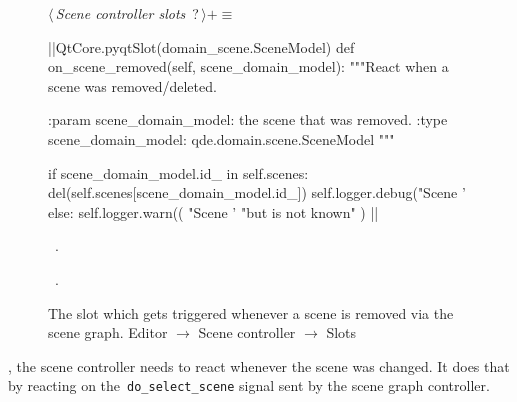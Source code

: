 \documentclass[%
    a4paper,    %
    justified,  %
    nobib,      %
    openany     %
]{tufte-book}
\begin{document}
\begin{figure}
\begin{flushleft} \small
\begin{minipage}{\linewidth}\label{scrap94}\raggedright\small
{} $\langle\,${\itshape Scene controller slots}\nobreak\ {\footnotesize {?}}$\,\rangle+\equiv$
\vspace{-1ex}
\begin{pythoncode}
|\normalfont{}\fontfamily{}|QtCore.pyqtSlot(domain_scene.SceneModel)
def on_scene_removed(self, scene_domain_model):
    """React when a scene was removed/deleted.

    :param scene_domain_model: the scene that was removed.
    :type scene_domain_model:  qde.domain.scene.SceneModel
    """

    if scene_domain_model.id_ in self.scenes:
        del(self.scenes[scene_domain_model.id_])
        self.logger.debug("Scene '%
    else:
        self.logger.warn((
            "Scene '%
            "but is not known"
        ) %
|\NWsep|
\end{pythoncode}
\vspace{1.5ex}
\footnotesize
\begin{list}{}{\setlength{\itemsep}{-\parsep}\setlength{\itemindent}{-\leftmargin}}
\item \NWtxtMacroDefBy\ .
\item \NWtxtMacroRefIn\ .

\item{}
\end{list}
\end{minipage}\vspace{4ex}
\end{flushleft}
\caption{The slot which gets triggered whenever a scene is removed via the
  scene graph.
  \newline{}\newline{}Editor $\rightarrow$ Scene controller $\rightarrow$
  Slots}
\label{editor:lst:scene-controller:slots:on-scene-removed}
\end{figure}

, the scene controller needs to react
whenever the scene was changed. It does that by reacting on
the~\verb=do_select_scene= signal sent by the scene graph controller.
\end{document}

